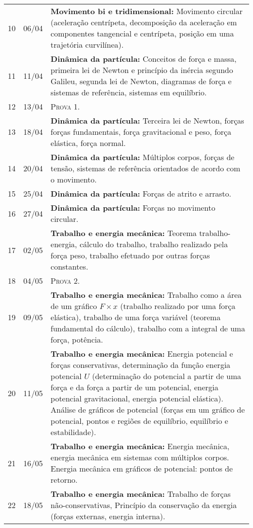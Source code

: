 \begin{center}
\begin{longtable}{ccp{70mm}}
10	 & 	06/04	 & 	\textbf{Movimento bi e tridimensional:} Movimento circular (aceleração centrípeta, decomposição da aceleração em componentes tangencial e centrípeta, posição em uma trajetória curvilínea). \\
11	 & 	11/04	 & 	\textbf{Dinâmica da partícula:} Conceitos de força e massa, primeira lei de Newton e princípio da inércia segundo Galileu, segunda lei de Newton, diagramas de força e sistemas de referência, sistemas em equilíbrio.\\
12	 & 	13/04	 & 	\textsc{Prova 1}. \\
13	 & 	18/04	 & 	\textbf{Dinâmica da partícula:} Terceira lei de Newton, forças forças fundamentais, força gravitacional e peso, força elástica, força normal.\\
14	 & 	20/04	 & 	\textbf{Dinâmica da partícula:} Múltiplos corpos, forças de tensão, sistemas de referência orientados de acordo com o movimento.\\
15	 & 	25/04	 & 	\textbf{Dinâmica da partícula:} Forças de atrito e arrasto. \\
16	 & 	27/04	 & 	\textbf{Dinâmica da partícula:} Forças no movimento circular. \\
17	 & 	02/05	 & 	\textbf{Trabalho e energia mecânica:} Teorema trabalho-energia, cálculo do trabalho, trabalho realizado pela força peso, trabalho efetuado por outras forças constantes.\\
18	 & 	04/05	 & 	\textsc{Prova 2}. \\
19	 & 	09/05	 & 	\textbf{Trabalho e energia mecânica:} Trabalho como a área de um gráfico $F \times x$ (trabalho realizado por uma força elástica), trabalho de uma força variável (teorema fundamental do cálculo), trabalho com a integral de uma força, potência. \\
20	 & 	11/05	 & 	\textbf{Trabalho e energia mecânica:} Energia potencial e forças conservativas, determinação da função energia potencial $U$ (determinação do potencial a partir de uma força e da força a partir de um potencial, energia potencial gravitacional, energia potencial elástica). Análise de gráficos de potencial (forças em um gráfico de potencial, pontos e regiões de equilíbrio, equilíbrio e estabilidade).\\
21	 & 	16/05	 & 	\textbf{Trabalho e energia mecânica:} Energia mecânica, energia mecânica em sistemas com múltiplos corpos. Energia mecânica em gráficos de potencial: pontos de retorno. \\
22	 & 	18/05	 & 	\textbf{Trabalho e energia mecânica:} Trabalho de forças não-conservativas, Princípio da conservação da energia (forças externas, energia interna). \\

\end{longtable}
\end{center}
